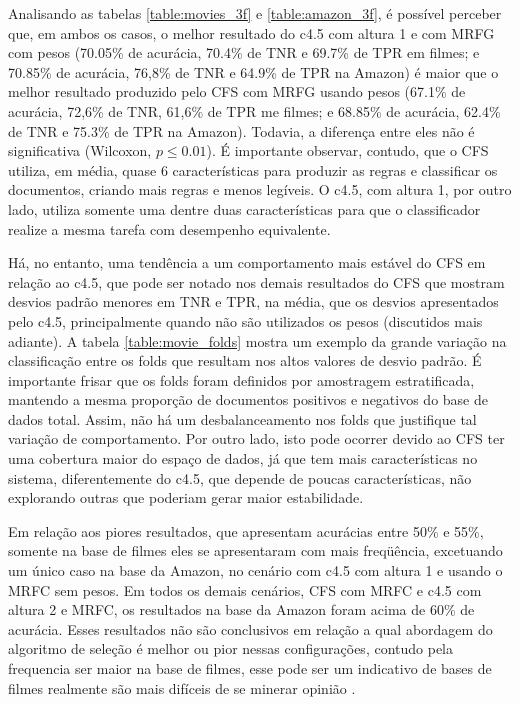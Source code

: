\documentclass[template.tex]{subfiles}
\begin{document}
Analisando as tabelas \ref{table:movies_3f} e \ref{table:amazon_3f}, é possível perceber que, em ambos os casos, o melhor resultado do c4.5 com altura 1 e com MRFG com pesos (70.05\% de acurácia, 70.4\% de TNR e 69.7\% de TPR em filmes; e 70.85\% de acurácia, 76,8\% de TNR e 64.9\% de TPR na Amazon) é maior que o melhor resultado produzido pelo CFS com MRFG usando pesos (67.1\% de acurácia, 72,6\% de TNR, 61,6\% de TPR me filmes; e 68.85\% de acurácia, 62.4\% de TNR e 75.3\% de TPR na Amazon).   Todavia, a diferença entre eles não é significativa (Wilcoxon, $p\leq0.01$). É importante observar, contudo, que o CFS utiliza, em média, quase 6 características para produzir as regras e classificar os documentos, criando mais regras e menos legíveis. O c4.5, com altura 1, por outro lado, utiliza somente uma dentre duas características para que o classificador realize a mesma tarefa com desempenho equivalente. 

Há, no entanto, uma tendência a um comportamento mais estável do CFS em relação ao c4.5, que pode ser notado nos demais resultados do CFS que mostram desvios padrão menores em TNR e TPR,  na média, que os desvios apresentados pelo c4.5, principalmente quando não são utilizados os pesos (discutidos mais adiante). A tabela \ref{table:movie_folds} mostra um exemplo da grande variação na classificação entre os folds que resultam nos altos valores de desvio padrão. É importante frisar que os folds foram definidos por amostragem estratificada, mantendo a mesma proporção de documentos positivos e negativos do base de dados total. Assim, não há um desbalanceamento nos folds que justifique tal variação de comportamento. Por outro lado, isto pode ocorrer devido ao CFS ter uma cobertura maior do espaço de dados, já que tem mais características no sistema, diferentemente do c4.5, que depende de poucas características, não explorando outras que poderiam gerar maior estabilidade.

Em relação aos piores resultados, que apresentam acurácias entre 50\% e 55\%, somente na base de filmes eles se apresentaram com mais freqüência, excetuando um único caso na base da Amazon, no cenário com c4.5 com altura 1 e usando o MRFC sem pesos. Em todos os demais cenários, CFS com MRFC e c4.5 com altura 2 e MRFC, os resultados na base da Amazon foram acima de 60\% de acurácia. Esses resultados não são conclusivos em relação a qual abordagem do algoritmo de seleção é melhor ou pior nessas configurações, contudo pela frequencia ser maior na base de filmes, esse pode ser um indicativo de bases de filmes realmente são mais difíceis de se minerar opinião \cite{pang2002thumbs, chaovalit2005movie, whitelaw2005using}.
\end{document}
